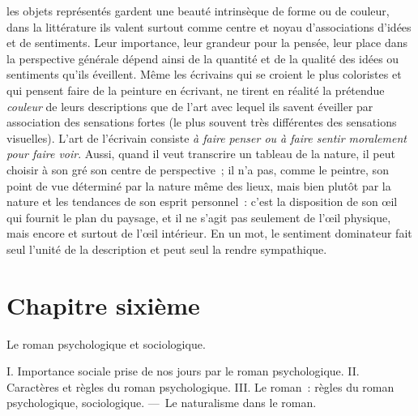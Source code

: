 \documentclass[french,twoside]{book} %
\newcommand\chapteropen{} %
\newcommand\chaptercont{} %
\newcommand\chapterclose{} %
\begin{document}
les objets représentés gardent une beauté intrinsèque de forme ou de couleur, dans la littérature ils valent surtout comme centre et noyau d’associations d’idées et de sentiments. Leur importance, leur grandeur pour la pensée, leur place dans la perspective générale dépend ainsi de la quantité et de la qualité des idées ou sentiments qu’ils éveillent. Même les écrivains qui se croient le plus coloristes et qui pensent faire de la peinture en écrivant, ne tirent en réalité la prétendue \emph{couleur} de leurs descriptions que de l’art avec lequel ils savent éveiller par association des sensations fortes (le plus souvent très différentes des sensations visuelles). L’art de l’écrivain consiste \emph{à faire penser ou à faire sentir moralement pour faire voir}. Aussi, quand il veut transcrire un tableau de la nature, il peut choisir à son gré son centre de perspective ; il n’a pas, comme le peintre, son point de vue déterminé par la nature même des lieux, mais bien plutôt par la nature et les tendances de son esprit personnel : c’est la disposition de son œil qui fournit le plan du paysage, et il ne s’agit pas seulement de l’œil physique, mais encore et surtout de l’œil intérieur. En un mot, le sentiment dominateur fait seul l’unité de la description et peut seul la rendre sympathique.
\chapterclose


\chapteropen
\chapter[{Chapitre sixième}]{Chapitre sixième}\renewcommand{\leftmark}{Chapitre sixième}

\begin{center}Le roman psychologique et sociologique.\end{center}

\chaptercont
\noindent I. Importance sociale prise de nos jours par le roman psychologique. II. Caractères et règles du roman psychologique. III. Le roman : règles du roman psychologique, sociologique. — Le naturalisme dans le roman.\par
\par
\end{document}
